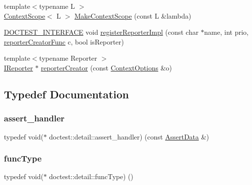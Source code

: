 \begin{DoxyCompactItemize}
\item 
{\footnotesize template$<$typename L $>$ }\\\hyperlink{classdoctest_1_1detail_1_1ContextScope}{Context\+Scope}$<$ L $>$ \hyperlink{namespacedoctest_1_1detail_a193493f40330f096b9e1b78557a832a3}{Make\+Context\+Scope} (const L \&lambda)
\item 
\hyperlink{doctest_8h_a9c16ffc635ec47f07797d21ede26b1a5}{D\+O\+C\+T\+E\+S\+T\+\_\+\+I\+N\+T\+E\+R\+F\+A\+CE} void \hyperlink{namespacedoctest_1_1detail_a828e011bb6028ab94eb14a3c7d8bd2c4}{register\+Reporter\+Impl} (const char $\ast$name, int prio, \hyperlink{namespacedoctest_1_1detail_a030c0c44c25bdebe6a83858d1f454f72}{reporter\+Creator\+Func} c, bool is\+Reporter)
\item 
{\footnotesize template$<$typename Reporter $>$ }\\\hyperlink{structdoctest_1_1IReporter}{I\+Reporter} $\ast$ \hyperlink{namespacedoctest_1_1detail_a575cd92f018bfe3c702432a2144ebaca}{reporter\+Creator} (const \hyperlink{structdoctest_1_1ContextOptions}{Context\+Options} \&o)
\end{DoxyCompactItemize}


\subsection{Typedef Documentation}
\mbox{\label{namespacedoctest_1_1detail_a5b5db6997f20389de5735e3ee3439b95}} 
\subsubsection{\texorpdfstring{assert\+\_\+handler}{assert\_handler}}
{\footnotesize\ttfamily typedef void($\ast$ doctest\+::detail\+::assert\+\_\+handler) (const \hyperlink{structdoctest_1_1AssertData}{Assert\+Data} \&)}

\mbox{\label{namespacedoctest_1_1detail_a7b2c60631c5f4906b26acf2e6b0e6e45}} 
\subsubsection{\texorpdfstring{func\+Type}{funcType}}
{\footnotesize\ttfamily typedef void($\ast$ doctest\+::detail\+::func\+Type) ()}

